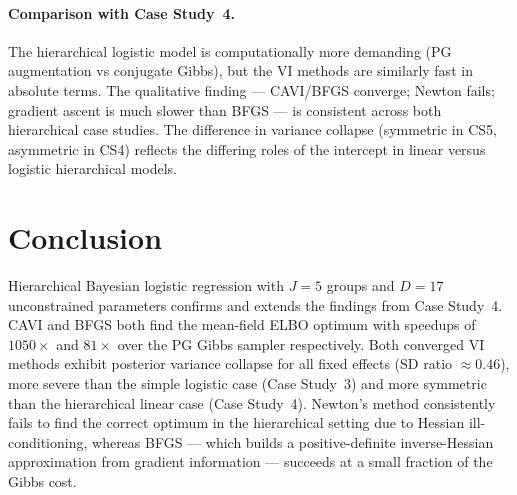 \documentclass[11pt,a4paper]{article}
\begin{document}
\paragraph{Comparison with Case Study~4.}
The hierarchical logistic model is computationally more demanding (PG augmentation
vs conjugate Gibbs), but the VI methods are similarly fast in absolute terms.
The qualitative finding --- CAVI/BFGS converge; Newton fails; gradient ascent is
much slower than BFGS --- is consistent across both hierarchical case studies.
The difference in variance collapse (symmetric in CS5, asymmetric in CS4) reflects the
differing roles of the intercept in linear versus logistic hierarchical models.

\section{Conclusion}

Hierarchical Bayesian logistic regression with $J=5$ groups and $D=17$ unconstrained
parameters confirms and extends the findings from Case Study~4.
CAVI and BFGS both find the mean-field ELBO optimum with speedups of
$1050\times$ and $81\times$ over the PG Gibbs sampler respectively.
Both converged VI methods exhibit posterior variance collapse for all fixed effects
(SD ratio $\approx 0.46$), more severe than the simple logistic case (Case Study~3)
and more symmetric than the hierarchical linear case (Case Study~4).
Newton's method consistently fails to find the correct optimum in the hierarchical
setting due to Hessian ill-conditioning, whereas BFGS --- which builds a positive-definite
inverse-Hessian approximation from gradient information --- succeeds at a small fraction
of the Gibbs cost.

\printbibliography
\end{document}

